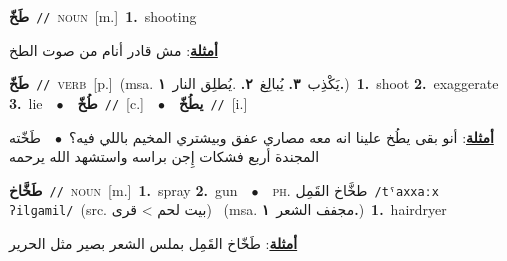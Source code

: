 \documentclass[10pt,a4paper,twoside]{article} %
\begin{document}
\begin{multicols}{2}
{\setlength\topsep{0pt}\textbf{\foreignlanguage{arabic}{طَخّ}}\ {\color{gray}\texttt{//}\color{black}}\ \textsc{noun}\ [m.]\ \textbf{1.}~shooting\  \begin{flushright}\color{gray}\foreignlanguage{arabic}{\textbf{\underline{\foreignlanguage{arabic}{أمثلة}}}: مش قادر أنام من صوت الطخ}\end{flushright}\color{black}} \vspace{2mm}

{\setlength\topsep{0pt}\textbf{\foreignlanguage{arabic}{طَخّ}}\ {\color{gray}\texttt{//}\color{black}}\ \textsc{verb}\ [p.]\ \color{gray}(msa. \foreignlanguage{arabic}{يَكْذِب}~\foreignlanguage{arabic}{\textbf{٣.}}  \foreignlanguage{arabic}{يُبالِغ}~\foreignlanguage{arabic}{\textbf{٢.}}  .\foreignlanguage{arabic}{يُطلِق النار}~\foreignlanguage{arabic}{\textbf{١.}})\color{black}\ \textbf{1.}~shoot  \textbf{2.}~exaggerate  \textbf{3.}~lie\ \ $\bullet$\ \ \setlength\topsep{0pt}\textbf{\foreignlanguage{arabic}{طُخّ}}\ {\color{gray}\texttt{//}\color{black}}\ [c.]\ \ $\bullet$\ \ \setlength\topsep{0pt}\textbf{\foreignlanguage{arabic}{يطُخّ}}\ {\color{gray}\texttt{//}\color{black}}\ [i.]\  \begin{flushright}\color{gray}\foreignlanguage{arabic}{\textbf{\underline{\foreignlanguage{arabic}{أمثلة}}}: أنو بقى يطُخ علينا انه معه مصاري عفق وبيشتري المخيم باللي فيه؟\ $\bullet$\ \  طَخّته المجندة أربع فشكات إِجن براسه واستشهد الله يرحمه}\end{flushright}\color{black}} \vspace{2mm}

{\setlength\topsep{0pt}\textbf{\foreignlanguage{arabic}{طَخَّاخ}}\ {\color{gray}\texttt{//}\color{black}}\ \textsc{noun}\ [m.]\ \textbf{1.}~spray  \textbf{2.}~gun\ \ $\bullet$\ \ \textsc{ph.} \color{gray} \foreignlanguage{arabic}{طخَّاخ القَمِل}\color{black}\ {\color{gray}\texttt{/{\sffamily tˤaxxaːx ʔilɡamil}/}\color{black}}\ \color{gray}(src. \foreignlanguage{arabic}{بيت لحم > قرى})\color{black}\ \color{gray} (msa. \foreignlanguage{arabic}{مجفف الشعر}~\foreignlanguage{arabic}{\textbf{١.}})\color{black}\ \textbf{1.}~hairdryer\  \begin{flushright}\color{gray}\foreignlanguage{arabic}{\textbf{\underline{\foreignlanguage{arabic}{أمثلة}}}: طَخّاخ القَمِل بملس الشعر بصير مثل الحرير}\end{flushright}\color{black}} \vspace{2mm}


\end{multicols}
\end{document}
